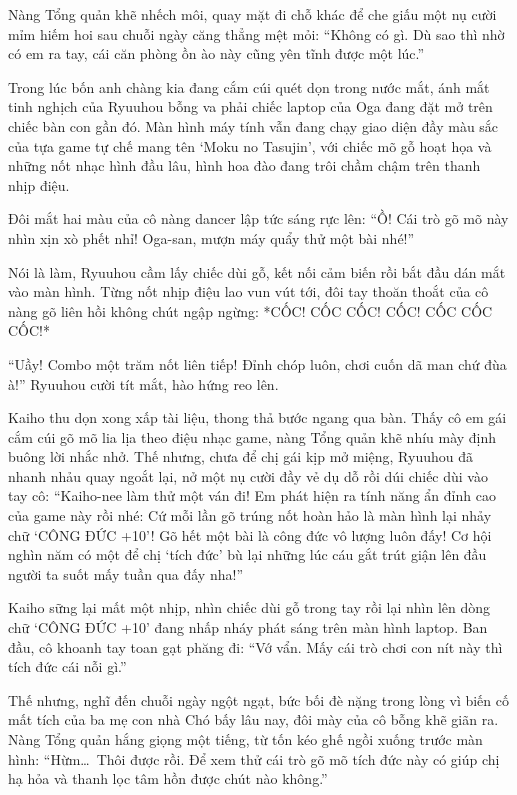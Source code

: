 \documentclass[../main.tex]{subfiles}
\begin{document}
Nàng Tổng quản khẽ nhếch môi, quay mặt đi chỗ khác để che giấu một nụ cười mỉm hiếm hoi sau chuỗi ngày căng thẳng mệt mỏi: ``Không có gì. Dù sao thì nhờ có em ra tay, cái căn phòng ồn ào này cũng yên tĩnh được một lúc.''

Trong lúc bốn anh chàng kia đang cắm cúi quét dọn trong nước mắt, ánh mắt tinh nghịch của Ryuuhou bỗng va phải chiếc laptop của Oga đang đặt mở trên chiếc bàn con gần đó. Màn hình máy tính vẫn đang chạy giao diện đầy màu sắc của tựa game tự chế mang tên `Moku no Tasujin', với chiếc mõ gỗ hoạt họa và những nốt nhạc hình đầu lâu, hình hoa đào đang trôi chầm chậm trên thanh nhịp điệu.

Đôi mắt hai màu của cô nàng dancer lập tức sáng rực lên: ``Ồ! Cái trò gõ mõ này nhìn xịn xò phết nhỉ! Oga-san, mượn máy quẩy thử một bài nhé!''

Nói là làm, Ryuuhou cầm lấy chiếc dùi gỗ, kết nối cảm biến rồi bắt đầu dán mắt vào màn hình. Từng nốt nhịp điệu lao vun vút tới, đôi tay thoăn thoắt của cô nàng gõ liên hồi không chút ngập ngừng: *CỐC! CỐC CỐC! CỐC! CỐC CỐC CỐC!*

``Uầy! Combo một trăm nốt liên tiếp! Đỉnh chóp luôn, chơi cuốn dã man chứ đùa à!'' Ryuuhou cười tít mắt, hào hứng reo lên.

Kaiho thu dọn xong xấp tài liệu, thong thả bước ngang qua bàn. Thấy cô em gái cắm cúi gõ mõ lia lịa theo điệu nhạc game, nàng Tổng quản khẽ nhíu mày định buông lời nhắc nhở. Thế nhưng, chưa để chị gái kịp mở miệng, Ryuuhou đã nhanh nhảu quay ngoắt lại, nở một nụ cười đầy vẻ dụ dỗ rồi dúi chiếc dùi vào tay cô: ``Kaiho-nee làm thử một ván đi! Em phát hiện ra tính năng ẩn đỉnh cao của game này rồi nhé: Cứ mỗi lần gõ trúng nốt hoàn hảo là màn hình lại nhảy chữ `CÔNG ĐỨC +10'! Gõ hết một bài là công đức vô lượng luôn đấy! Cơ hội nghìn năm có một để chị `tích đức' bù lại những lúc cáu gắt trút giận lên đầu người ta suốt mấy tuần qua đấy nha!''

Kaiho sững lại mất một nhịp, nhìn chiếc dùi gỗ trong tay rồi lại nhìn lên dòng chữ `CÔNG ĐỨC +10' đang nhấp nháy phát sáng trên màn hình laptop. Ban đầu, cô khoanh tay toan gạt phăng đi: ``Vớ vẩn. Mấy cái trò chơi con nít này thì tích đức cái nỗi gì.''

Thế nhưng, nghĩ đến chuỗi ngày ngột ngạt, bức bối đè nặng trong lòng vì biến cố mất tích của ba mẹ con nhà Chó bấy lâu nay, đôi mày của cô bỗng khẽ giãn ra. Nàng Tổng quản hắng giọng một tiếng, từ tốn kéo ghế ngồi xuống trước màn hình: ``Hừm\dots\ Thôi được rồi. Để xem thử cái trò gõ mõ tích đức này có giúp chị hạ hỏa và thanh lọc tâm hồn được chút nào không.''
\end{document}
